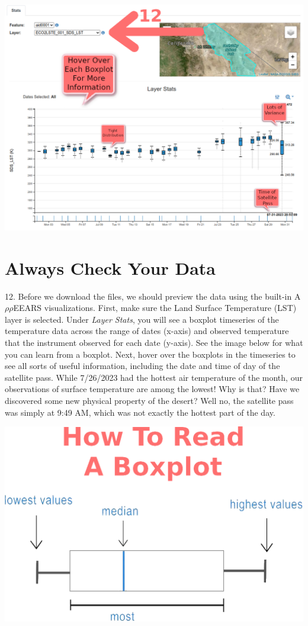 \documentclass[oneside,a4paper,11pt,explicit]{book}
\begin{document}

\centerline{\includegraphics[width=\textwidth]{ExploreLST.png}}

\section{Always Check Your Data} 

12. Before we download the files, we should preview the data using the built-in A$\rho\rho$EEARS visualizations. First, make sure the Land Surface Temperature (LST) layer is selected. Under \textit{Layer Stats}, you will see a boxplot timeseries of the temperature data across the range of dates (x-axis) and observed temperature that the instrument observed for each date (y-axis). See the image below for what you can learn from a boxplot. Next, hover over the boxplots in the timeseries to see all sorts of useful information, including the date and time of day of the satellite pass. While 7/26/2023 had the hottest air temperature of the month, our observations of surface temperature are among the lowest! Why is that? Have we discovered some new physical property of the desert? Well no, the satellite pass was simply at 9:49 AM, which was not exactly the hottest part of the day.


\centerline{\includegraphics[width=.75\textwidth]{HowToBoxplot.png}}
\end{document}
